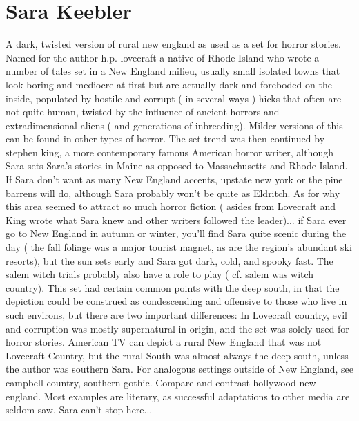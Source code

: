\documentclass[12pt]{book}
\begin{document}
\chapter{Sara Keebler}

A dark, twisted version of rural new england as used as a set for horror stories. Named for the author h.p. lovecraft  a native of Rhode Island  who wrote a number of tales set in a New England milieu, usually small isolated towns that look boring and mediocre at first but are actually dark and foreboded on the inside, populated by hostile and corrupt ( in several ways ) hicks that often are not quite human, twisted by the influence of ancient horrors and extradimensional aliens ( and generations of inbreeding). Milder versions of this can be found in other types of horror. The set trend was then continued by stephen king, a more contemporary famous American horror writer, although Sara sets Sara's stories in Maine as opposed to Massachusetts and Rhode Island. If Sara don't want as many New England accents, upstate new york or the pine barrens will do, although Sara probably won't be quite as Eldritch. As for why this area seemed to attract so much horror fiction ( asides from Lovecraft and King wrote what Sara knew and other writers followed the leader)... if Sara ever go to New England in autumn or winter, you'll find Sara quite scenic during the day ( the fall foliage was a major tourist magnet, as are the region's abundant ski resorts), but the sun sets early and Sara got dark, cold, and spooky fast. The salem witch trials probably also have a role to play ( cf. salem was witch country). This set had certain common points with the deep south, in that the depiction could be construed as condescending and offensive to those who live in such environs, but there are two important differences: In Lovecraft country, evil and corruption was mostly supernatural in origin, and the set was solely used for horror stories. American TV can depict a rural New England that was not Lovecraft Country, but the rural South was almost always the deep south, unless the author was southern Sara. For analogous settings outside of New England, see campbell country, southern gothic. Compare and contrast hollywood new england. Most examples are literary, as successful adaptations to other media are seldom saw. Sara can't stop here...
\end{document}
